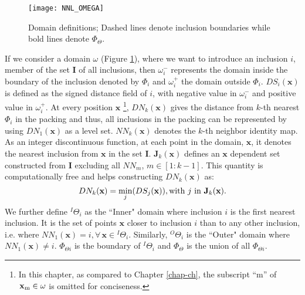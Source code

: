 \begin{figure}[tp]
	\centering
	\texttt{[image: NNL\_OMEGA]}
	\caption{Domain definitions; Dashed lines denote inclusion boundaries while bold lines denote $ \Phi_\Theta$.}\label{omega}
\end{figure}

If we consider a domain $ \omega $ (Figure \ref{omega}), where we want to introduce an inclusion $ i  $, member of the set $ \textbf{I} $ of all inclusions, then $ \omega_i^- $ represents the domain inside the boundary of the inclusion denoted by $ \Phi_i $ and $ \omega_i^+ $ the domain outside $ \Phi_i $. $ DS_i(\textbf{x}) $ is defined as the signed distance field of $ i $, with negative value in $ \omega_i^- $ and positive value in $ \omega_i^+ $. At every position $ \textbf{x} $ \footnote{In this chapter, as compared to Chapter \ref{chap-ch}, the subscript ``m'' of $ ^{}\textbf{x}_\text{m}\in\omega $ is omitted for conciseness.}, $ DN_k(\textbf{x}) $ gives the distance from $k $-th nearest $ \Phi_i $ in the packing and thus, all inclusions in the packing can be represented by using $ DN_1(\textbf{x}) $ as a level set. $ NN_k(\textbf{x}) $ denotes the $ k $-th neighbor identity map. As an integer discontinuous function, at each point in the domain, $ \textbf{x} $, it denotes the nearest inclusion from $ \textbf{x} $ in the set $ \textbf{I} $. $ \textbf{J}_k(\textbf{x}) $ defines an $ \textbf{x} $ dependent set constructed from $ \textbf{I} $ excluding all $ NN_m $, $ m\in[1:k-1] $. 
This quantity is computationally free and helps constructing $ DN_k(\textbf{x}) $ as:
\begin{equation}
DN_k(\textbf{x})=\displaystyle\min_j(DS_j(\textbf{x})),\text{with $ j $ in } \textbf{J}_k(\textbf{x}).
\end{equation}
We further define $ ^I\Theta_i $ as the ``Inner" domain where inclusion $ i $ is the first nearest inclusion. It is the set of points $ \textbf{x} $  closer to inclusion $ i $ than to any other inclusion, i.e. where $ NN_1(\textbf{x})=i, \forall\, \textbf{x} \in {^I\Theta_i} $. Similarly, $ ^O\Theta_i $ is the ``Outer" domain where $ NN_1(\textbf{x})\ne i $. $ \Phi_{\Theta i} $ is the boundary of $ ^I\Theta_i $ and $ \Phi_{\Theta} $ is the union of all $ \Phi_{\Theta i} $.

